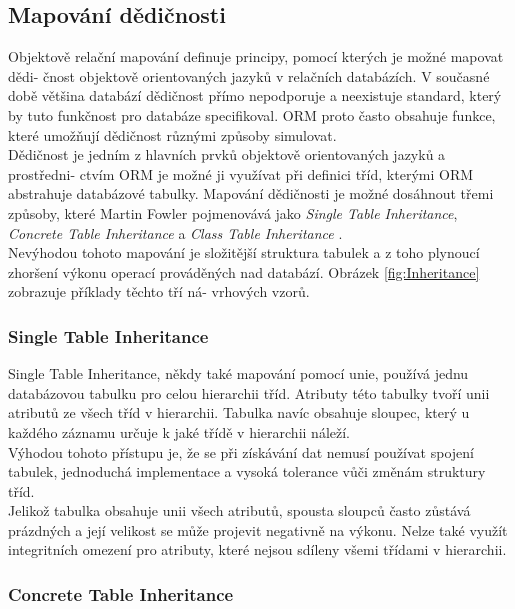 \documentclass[ing,male,java,dept456]{diploma}						%
\begin{document}
\subsection{Mapování dědičnosti}
\label{subsec:Inhmapping}
Objektově relační mapování definuje principy, pomocí kterých je možné mapovat dědi- čnost objektově orientovaných jazyků v relačních databázích. V současné době většina databází dědičnost přímo nepodporuje a neexistuje standard, který by tuto funkčnost pro databáze specifikoval. ORM proto často obsahuje funkce, které umožňují dědičnost různými způsoby simulovat. \\
Dědičnost je jedním z hlavních prvků objektově orientovaných jazyků a prostředni- ctvím ORM je možné ji využívat při definici tříd, kterými ORM abstrahuje databázové tabulky. Mapování dědičnosti je možné dosáhnout třemi způsoby, které Martin Fowler pojmenovává jako \textit{Single Table Inheritance}, \textit{Concrete Table Inheritance} a \textit{Class Table Inheritance} \cite{fowler}. \\
Nevýhodou tohoto mapování je složitější struktura tabulek a z toho plynoucí zhoršení výkonu operací prováděných nad databází. Obrázek \ref{fig:Inheritance} zobrazuje příklady těchto tří ná- vrhových vzorů.


\subsubsection{Single Table Inheritance}

Single Table Inheritance, někdy také mapování pomocí unie, používá jednu databázovou tabulku pro celou hierarchii tříd. Atributy této tabulky tvoří unii atributů ze všech tříd v hierarchii. Tabulka navíc obsahuje sloupec, který u každého záznamu určuje k jaké třídě v hierarchii náleží. \\
Výhodou tohoto přístupu je, že se při získávání dat nemusí používat spojení tabulek, jednoduchá implementace a vysoká tolerance vůči změnám struktury tříd. \\
Jelikož tabulka obsahuje unii všech atributů, spousta sloupců často zůstává prázdných a její velikost se může projevit negativně na výkonu. Nelze také využít integritních omezení pro atributy, které nejsou sdíleny všemi třídami v hierarchii.

\subsubsection{Concrete Table Inheritance}
\end{document}
